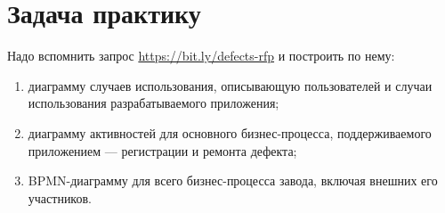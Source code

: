 \documentclass{../../text-style}
\begin{document}
\maketitle
\thispagestyle{empty}

\section{Задача практику}

Надо вспомнить запрос \url{https://bit.ly/defects-rfp} и построить по нему:

\begin{enumerate}
    \item диаграмму случаев использования, описывающую пользователей и случаи использования разрабатываемого приложения;
    \item диаграмму активностей для основного бизнес-процесса, поддерживаемого приложением --- регистрации и ремонта дефекта;
    \item BPMN-диаграмму для всего бизнес-процесса завода, включая внешних его участников.
\end{enumerate}
\end{document}
